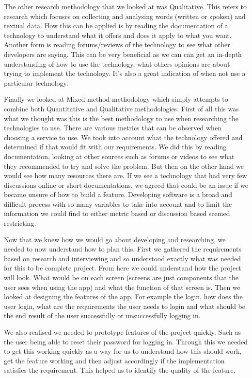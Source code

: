 The other research methodology that we looked at was Qualitative. This refers to research which focuses on collecting and analysing words (written or spoken) and textual data\cite{ezzy2013qualitative}. How this can be applied is by reading the documentation of a technology to understand what it offers and does it apply to what you want. Another form is reading forums/reviews of the technology to see what other developers are saying. This can be very beneficial as we can can get an in-depth understanding of how to use the technology, what others opinions are about trying to implement the technology. It's also a great indication of when not use a particular technology.

Finally we looked at Mixed-method methodology which simply attempts to combine both Quantitative and Qualitative methodologies\cite{creswell1999mixed}. First of all this was what we thought was this is the best methodology to use when researching the technologies to use. There are various metrics that can be observed when choosing a service to use. We took into account what the technology offered and determined if that would fit with our requirements. We did this by reading documentation, looking at other sources such as forums or videos to see what they recommended to try and solve the problem. But then on the other hand we would see how many resources there are. If we see a technology that had very few discussions online or short documentations, we agreed that could be an issue if we became unsure of how to build a feature. Developing software is a broad and difficult process with so many variables to take into account and to limit the information we could find to either metric based or discussion based seemed restricting. 

Now that we knew how we would go about developing and researching, we needed to now understand how to plan this. First we gathered the requirements based on research and interviewing and so understood exactly what was needed for this to be complete project. From here we could understand how the project will look. What would be on each screen (screens are just components that the user sees when using the app) and what the function of that screen is. Then we looked at designing the features of the app. For example the login, how does the user login, what are the requirements the user needs to login and what should be the end result of the user successfully or unsuccessfully logging in.

We also realised we needed to prototype features of the project quickly. Such as the user being able to reset their password for logging in. Through this we needed to get this working quickly as a way for us to understand how this should work, get the feature working and then adjust accordingly if the implementation satisfies the requirement. This helped us to identify the quality of the feature. 

